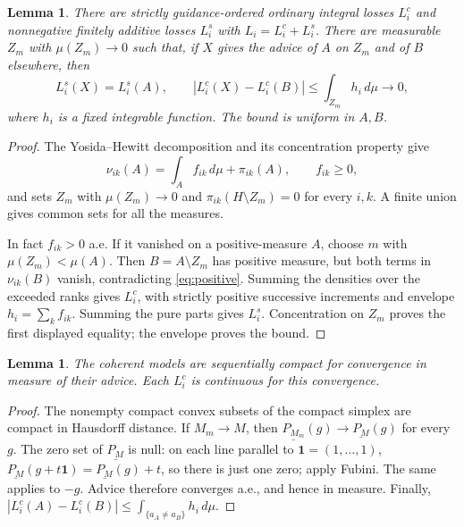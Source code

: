 \documentclass[11pt]{article}
\newtheorem{lemma}[theorem]{Lemma}
\theoremstyle{remark}\newtheorem{remark}[theorem]{Remark}
\newcommand{\one}{\mathbf 1}
\begin{document}
\begin{lemma}\label{lem:split}
There are strictly guidance-ordered ordinary integral losses $L_i^c$ and
nonnegative finitely additive losses $L_i^s$ with $L_i=L_i^c+L_i^s$.
There are measurable $Z_m$ with $\mu(Z_m)\to0$ such that, if $X$ gives the
advice of $A$ on $Z_m$ and of $B$ elsewhere, then
\[
 L_i^s(X)=L_i^s(A),\qquad
 |L_i^c(X)-L_i^c(B)|\le\int_{Z_m}h_i\,d\mu\longrightarrow0,
\]
where $h_i$ is a fixed integrable function. The bound is uniform in $A,B$.
\end{lemma}
\begin{proof}
The Yosida--Hewitt decomposition and its concentration property
\cite[Theorem 1 and its proof]{PP} give
\[
 \nu_{ik}(A)=\int_A f_{ik}\,d\mu+\pi_{ik}(A),\qquad f_{ik}\ge0,
\]
and sets $Z_m$ with $\mu(Z_m)\to0$ and
$\pi_{ik}(H\setminus Z_m)=0$ for every $i,k$. A finite union gives common
sets for all the measures.

In fact $f_{ik}>0$ a.e. If it vanished on a positive-measure $A$, choose
$m$ with $\mu(Z_m)<\mu(A)$. Then $B=A\setminus Z_m$ has positive measure,
but both terms in $\nu_{ik}(B)$ vanish, contradicting
\eqref{eq:positive}. Summing the densities over the exceeded ranks gives
$L_i^c$, with strictly positive successive increments and envelope
$h_i=\sum_k f_{ik}$. Summing the pure parts gives $L_i^s$.
Concentration on $Z_m$ proves the first displayed equality; the envelope
proves the bound.
\end{proof}

\begin{lemma}\label{lem:compact}
The coherent models are sequentially compact for convergence in measure
of their advice. Each $L_i^c$ is continuous for this convergence.
\end{lemma}
\begin{proof}
The nonempty compact convex subsets of the compact simplex are compact
in Hausdorff distance. If $M_m\to M$, then
$\underline{P_{M_m}}(g)\to\underline{P_M}(g)$ for every $g$.
The zero set of $\underline{P_M}$ is null: on each line parallel to
$\one=(1,\ldots,1)$,
$\underline{P_M}(g+t\one)=\underline{P_M}(g)+t$, so there is just one zero;
apply Fubini. The same applies to $-g$. Advice therefore converges a.e.,
and hence in measure. Finally,
$|L_i^c(A)-L_i^c(B)|\le\int_{\{a_A\ne a_B\}}h_i\,d\mu$.
\end{proof}
\end{document}
